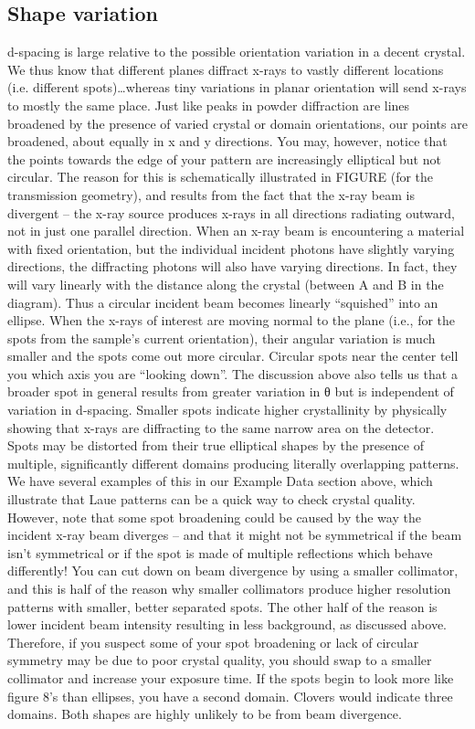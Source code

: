 \subsection{Shape variation}
d-spacing is large relative to the possible orientation variation in a decent crystal. We thus know that different planes diffract x-rays to vastly different locations (i.e. different spots)…whereas tiny variations in planar orientation will send x-rays to mostly the same place. Just like peaks in powder diffraction are lines broadened by the presence of varied crystal or domain orientations, our points are broadened, about equally in x and y directions.
You may, however, notice that the points towards the edge of your pattern are increasingly elliptical but not circular. The reason for this is schematically illustrated in FIGURE (for the transmission geometry), and results from the fact that the x-ray beam is divergent – the x-ray source produces x-rays in all directions radiating outward, not in just one parallel direction. 
When an x-ray beam is encountering a material with fixed orientation, but the individual incident photons have slightly varying directions, the diffracting photons will also have varying directions. In fact, they will vary linearly with the distance along the crystal (between A and B in the diagram). Thus a circular incident beam becomes linearly “squished” into an ellipse. When the x-rays of interest are moving normal to the plane (i.e., for the spots from the sample’s current orientation), their angular variation is much smaller and the spots come out more circular. Circular spots near the center tell you which axis you are “looking down”.
The discussion above also tells us that a broader spot in general results from greater variation in θ but is independent of variation in d-spacing. Smaller spots indicate higher crystallinity by physically showing that x-rays are diffracting to the same narrow area on the detector. Spots may be distorted from their true elliptical shapes by the presence of multiple, significantly different domains producing literally overlapping patterns. We have several examples of this in our Example Data section above, which illustrate that Laue patterns can be a quick way to check crystal quality. However, note that some spot broadening could be caused by the way the incident x-ray beam diverges – and that it might not be symmetrical if the beam isn’t symmetrical or if the spot is made of multiple reflections which behave differently!
You can cut down on beam divergence by using a smaller collimator, and this is half of the reason why smaller collimators produce higher resolution patterns with smaller, better separated spots. The other half of the reason is lower incident beam intensity resulting in less background, as discussed above.
Therefore, if you suspect some of your spot broadening or lack of circular symmetry may be due to poor crystal quality, you should swap to a smaller collimator and increase your exposure time. If the spots begin to look more like figure 8’s than ellipses, you have a second domain. Clovers would indicate three domains. Both shapes are highly unlikely to be from beam divergence. 
